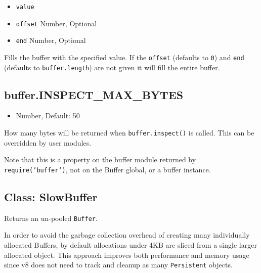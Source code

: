 \begin{itemize}
\itemsep1pt\parskip0pt
\item
  \texttt{value}
\item
  \texttt{offset} Number, Optional
\item
  \texttt{end} Number, Optional
\end{itemize}

Fills the buffer with the specified value. If the \texttt{offset}
(defaults to \texttt{0}) and \texttt{end} (defaults to
\texttt{buffer.length}) are not given it will fill the entire buffer.

\begin{Shaded}
\begin{Highlighting}[]
  \NormalTok{(}\NormalTok{);}
\NormalTok{(}\NormalTok{);}
\end{Highlighting}
\end{Shaded}

\subsection{buffer.INSPECT\_MAX\_BYTES}\label{buffer.inspectux5fmaxux5fbytes}

\begin{itemize}
\itemsep1pt\parskip0pt
\item
  Number, Default: 50
\end{itemize}

How many bytes will be returned when \texttt{buffer.inspect()} is
called. This can be overridden by user modules.

Note that this is a property on the buffer module returned by
\texttt{require('buffer')}, not on the Buffer global, or a buffer
instance.

\subsection{Class: SlowBuffer}\label{class-slowbuffer}

Returns an un-pooled \texttt{Buffer}.

In order to avoid the garbage collection overhead of creating many
individually allocated Buffers, by default allocations under 4KB are
sliced from a single larger allocated object. This approach improves
both performance and memory usage since v8 does not need to track and
cleanup as many \texttt{Persistent} objects.

